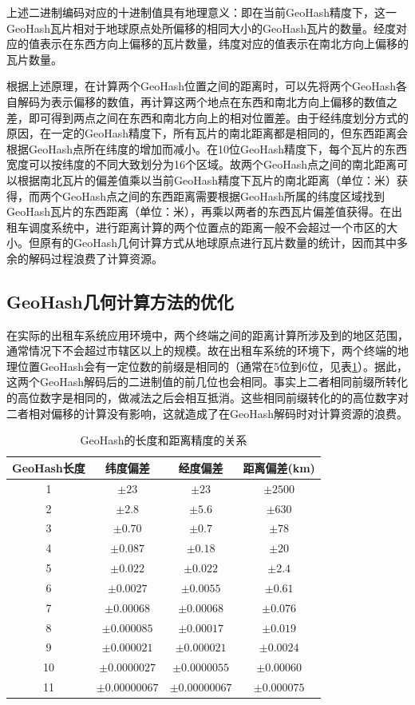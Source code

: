 上述二进制编码对应的十进制值具有地理意义：即在当前GeoHash精度下，这一GeoHash瓦片相对于地球原点处所偏移的相同大小的GeoHash瓦片的数量。经度对应的值表示在东西方向上偏移的瓦片数量，纬度对应的值表示在南北方向上偏移的瓦片数量。

根据上述原理，在计算两个GeoHash位置之间的距离时，可以先将两个GeoHash各自解码为表示偏移的数值，再计算这两个地点在东西和南北方向上偏移的数值之差，即可得到两点之间在东西和南北方向上的相对位置差。由于经纬度划分方式的原因，在一定的GeoHash精度下，所有瓦片的南北距离都是相同的，但东西距离会根据GeoHash点所在纬度的增加而减小。在10位GeoHash精度下，每个瓦片的东西宽度可以按纬度的不同大致划分为16个区域。故两个GeoHash点之间的南北距离可以根据南北瓦片的偏差值乘以当前GeoHash精度下瓦片的南北距离（单位：米）获得，而两个GeoHash点之间的东西距离需要根据GeoHash所属的纬度区域找到GeoHash瓦片的东西距离（单位：米），再乘以两者的东西瓦片偏差值获得。在出租车调度系统中，进行距离计算的两个位置点的距离一般不会超过一个市区的大小。但原有的GeoHash几何计算方式从地球原点进行瓦片数量的统计，因而其中多余的解码过程浪费了计算资源。

\subsection{GeoHash几何计算方法的优化}
在实际的出租车系统应用环境中，两个终端之间的距离计算所涉及到的地区范围，通常情况下不会超过市辖区以上的规模。故在出租车系统的环境下，两个终端的地理位置GeoHash会有一定位数的前缀是相同的（通常在5位到6位，见表\ref{tab:GeoHashScale}）。据此，这两个GeoHash解码后的二进制值的前几位也会相同。事实上二者相同前缀所转化的高位数字是相同的，做减法之后会相互抵消。这些相同前缀转化的的高位数字对二者相对偏移的计算没有影响，这就造成了在GeoHash解码时对计算资源的浪费。

\begin{table}
  \centering
  \caption{GeoHash的长度和距离精度的关系}\label{tab:GeoHashScale}
  \begin{tabular*}{0.9\textwidth}{@{\extracolsep{\fill}}cccc}
  \toprule
    GeoHash长度    &纬度偏差 &经度偏差 &距离偏差(km) \\
  \midrule
    1    &$\pm23$ &$\pm23$ &$\pm2500$\\
    2    &$\pm2.8$ &$\pm5.6$ &$\pm630$\\
    3    &$\pm0.70$ &$\pm0.7$ &$\pm78$\\
    4    &$\pm0.087$ &$\pm0.18$ &$\pm20$\\
    5    &$\pm0.022$ &$\pm0.022$ &$\pm2.4$\\
    6    &$\pm0.0027$ &$\pm0.0055$ &$\pm0.61$\\
    7    &$\pm0.00068$ &$\pm0.00068$ &$\pm0.076$\\
    8    &$\pm0.000085$ &$\pm0.00017$ &$\pm0.019$\\
    9    &$\pm0.000021$ &$\pm0.000021$ &$\pm0.0024$\\
    10    &$\pm0.0000027$ &$\pm0.0000055$ &$\pm0.00060$\\
    11    &$\pm0.00000067$ &$\pm0.00000067$ &$\pm0.000075$\\
  \bottomrule
  \end{tabular*}
\end{table}

